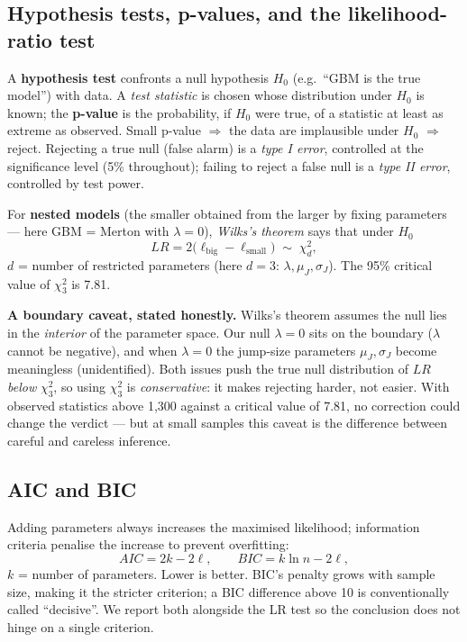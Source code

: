 \documentclass[11pt,a4paper]{article}
\begin{document}
\subsection{Hypothesis tests, p-values, and the likelihood-ratio test}
\label{sec:lrtest}
A \textbf{hypothesis test} confronts a null hypothesis $H_0$ (e.g.\ ``GBM is
the true model'') with data. A \emph{test statistic} is chosen whose
distribution under $H_0$ is known; the \textbf{p-value} is the probability,
if $H_0$ were true, of a statistic at least as extreme as observed. Small
p-value $\Rightarrow$ the data are implausible under $H_0$ $\Rightarrow$ reject.
Rejecting a true null (false alarm) is a \emph{type I error}, controlled at the
significance level (5\% throughout); failing to reject a false null is a
\emph{type II error}, controlled by test power.

For \textbf{nested models} (the smaller obtained from the larger by fixing
parameters --- here GBM = Merton with $\lambda=0$), \emph{Wilks's theorem} says
that under $H_0$
\begin{equation}
LR=2\big(\ell_{\text{big}}-\ell_{\text{small}}\big)\;\sim\;\chi^2_d ,
\label{eq:wilks}
\end{equation}
$d$ = number of restricted parameters (here $d=3$: $\lambda,\mu_J,\sigma_J$).
The 95\% critical value of $\chi^2_3$ is 7.81.

\textbf{A boundary caveat, stated honestly.} Wilks's theorem assumes the null
lies in the \emph{interior} of the parameter space. Our null $\lambda=0$ sits on
the boundary ($\lambda$ cannot be negative), and when $\lambda=0$ the jump-size
parameters $\mu_J,\sigma_J$ become meaningless (unidentified). Both issues push
the true null distribution of $LR$ \emph{below} $\chi^2_3$, so using
$\chi^2_3$ is \emph{conservative}: it makes rejecting harder, not easier. With
observed statistics above 1{,}300 against a critical value of 7.81, no
correction could change the verdict --- but at small samples this caveat is the
difference between careful and careless inference.

\subsection{AIC and BIC}
Adding parameters always increases the maximised likelihood; information
criteria penalise the increase to prevent overfitting:
\begin{equation}
AIC=2k-2\ell,\qquad BIC=k\ln n-2\ell ,
\end{equation}
$k$ = number of parameters. Lower is better. BIC's penalty grows with sample
size, making it the stricter criterion; a BIC difference above 10 is
conventionally called ``decisive''. We report both alongside the LR test so the
conclusion does not hinge on a single criterion.
\end{document}
